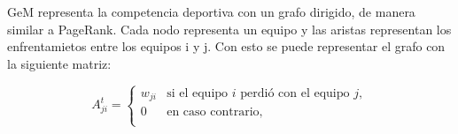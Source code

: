 GeM representa la competencia deportiva con un grafo dirigido, de manera similar a PageRank. Cada nodo representa un equipo y las aristas representan los enfrentamietos entre los equipos i y j. Con esto se puede representar el grafo con la siguiente matriz:

\begin{equation*}
A_{ji}^t = \left\{
  \begin{array}{cl}
  w_{ji} & \text{si el equipo } i \text{ perdi\'o con el equipo } j,\\
  0 & \text{en caso contrario, }\\
  \end{array} \right.
\end{equation*}


